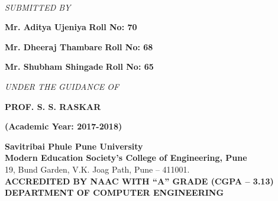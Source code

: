 \documentclass[a4paper, 12pt]{report}
\begin{document}
\begin{frontmatter}
\begin{titlepage}
\begin{center}
\begin{large}
\end{large}\\[1cm]
\textit{SUBMITTED BY}\\[0.5cm]
\begin{large}\textbf{Mr. Aditya Ujeniya}\hspace{1.4cm}
\textbf{Roll No:  70}\\\end{large}
\begin{large}\textbf{Mr. Dheeraj  Thambare}\hspace{0.5cm}
\textbf{Roll No: 68}\\\end{large}
\begin{large}\textbf{Mr. Shubham Shingade}\hspace{0.5cm}
\textbf{Roll No: 65}\\[1cm]\end{large}
\textit{UNDER THE GUIDANCE OF}\\[0.7cm]
\begin{large}\textbf{PROF. S. S. RASKAR}\\[0.3cm]\end{large}
\textbf{(Academic Year: 2017-2018)}

\vfill
\end{center}
\end{titlepage}

\begin{titlepage}
\begin{center}
\textup{\large  \textbf{Savitribai Phule Pune University}\\\textbf{Modern Education Society’s College of Engineering, Pune}}\\19, Bund Garden, V.K. Joag Path, Pune – 411001.\\[0.8cm]\textbf{ACCREDITED BY NAAC WITH \enquote{A} GRADE (CGPA – 3.13)}\\[0.8cm]\textbf{\large DEPARTMENT OF COMPUTER ENGINEERING}


\end{center}
\end{titlepage}
\end{frontmatter}
\end{document}
